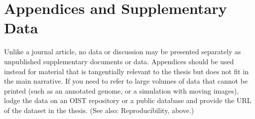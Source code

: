 

\chapter{Appendices and Supplementary Data} \label{appB}

Unlike a journal article, no data or discussion may be presented separately as unpublished supplementary documents or data.  Appendices should be used instead for material that is tangentially relevant to the thesis but does not fit in the main narrative. If you need to refer to large volumes of data that cannot be printed (such as an annotated genome, or a simulation with moving images), lodge the data on an OIST repository or a public database and provide the URL of the dataset in the thesis.  (See also: Reproducibility, above.)